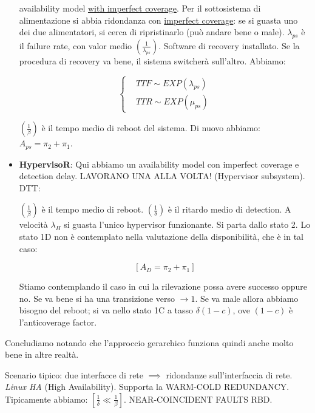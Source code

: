\begin{itemize}
availability model \underline{with imperfect coverage}. Per il sottosistema di alimentazione si abbia ridondanza con \underline{imperfect coverage}: se si guasta uno dei due alimentatori, si cerca di ripristinarlo (può andare bene o male). $\lambda_{ps}$ è il failure rate, con valor medio $(\frac{1}{\lambda_{ps}})$. Software di recovery installato. Se la procedura di recovery va bene, il sistema switcherà sull'altro. Abbiamo:

\[
	\left\{
	\begin{aligned}
	&TTF \sim EXP(\lambda_{ps})\\
	&TTR \sim EXP(\mu_{ps})
	\end{aligned}
	\right.
\]

$(\frac{1}{\beta})$ è il tempo medio di reboot del sistema. Di nuovo abbiamo: $A_{ps} = \pi_2+\pi_1$.

\item{\textbf{HypervisoR}}: Qui abbiamo un availability model con imperfect coverage e detection delay. LAVORANO UNA ALLA VOLTA! (Hypervisor subsystem). DTT:

\begin{center}
\end{center}

$(\frac{1}{\beta})$ è il tempo medio di reboot. $(\frac{1}{\delta})$ è il ritardo medio di detection. A velocità $\lambda_H$ si guasta l'unico hypervisor funzionante. Si parta dallo stato 2. Lo stato 1D non è contemplato nella valutazione della disponibilità, che è in tal caso:

\[
	[A_D = \pi_2+\pi_1]
\]

Stiamo contemplando il caso in cui la rilevazione possa avere successo oppure no. Se va bene si ha una transizione verso $\rightarrow 1$. Se va male allora abbiamo bisogno del reboot; si va nello stato 1C a tasso $\delta(1-c)$, ove $(1-c)$ è l'anticoverage factor.

\end{itemize}

Concludiamo notando che l'approccio gerarchico funziona quindi anche molto bene in altre realtà.

Scenario tipico: due interfacce di rete $\implies$ ridondanze sull'interfaccia di rete. \textit{Linux HA} (High Availability). Supporta la WARM-COLD REDUNDANCY. Tipicamente abbiamo: $[\frac{1}{\delta} \ll \frac{1}{\beta}]$. NEAR-COINCIDENT FAULTS RBD.